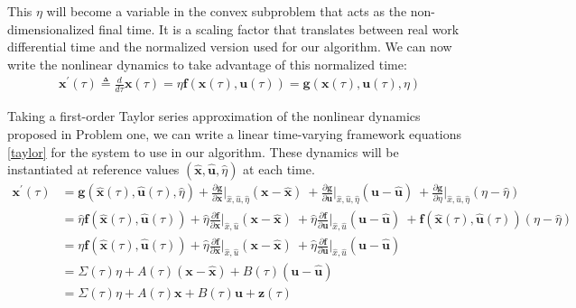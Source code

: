 This $\eta$ will become a variable in the convex subproblem that acts as the non-dimensionalized final time. It is a scaling factor that translates between real work differential time and the normalized version used for our algorithm. We can now write the nonlinear dynamics to take advantage of this normalized time:
\begin{align}
& \mathbf{x}^\prime(\tau) \triangleq \frac{d}{d\tau}\mathbf{x}(\tau) = \eta \mathbf{f}(\mathbf{x}(\tau), \mathbf{u}(\tau)) = \mathbf{g}(\mathbf{x}(\tau), \mathbf{u}(\tau), \eta)
\end{align}

Taking a first-order Taylor series approximation of the nonlinear dynamics proposed in Problem one, we can write a linear time-varying framework equations \ref{taylor} for the system to use in our algorithm. These dynamics will be instantiated at reference values $(\hat{\mathbf{x}}, \hat{\mathbf{u}}, \hat{\eta})$ at each time. 
%
\begin{subequations}
\label{taylor}
\begin{align}
\mathbf{x}^\prime(\tau) 
&= \mathbf{g}(\hat{\mathbf{x}}(\tau), \hat{\mathbf{u}}(\tau), \hat{\eta})
+ \frac{\partial \mathbf{g}}{\partial \mathbf{x}} \bigg\rvert_{\hat{x},\hat{u},\hat{\eta}} (\mathbf{x} - \hat{\mathbf{x}}) \ 
+ \frac{\partial \mathbf{g}}{\partial \mathbf{u}} \bigg\rvert_{\hat{x},\hat{u},\hat{\eta}} (\mathbf{u} - \hat{\mathbf{u}}) \ 
+ \frac{\partial \mathbf{g}}{\partial \eta} \bigg\rvert_{\hat{x},\hat{u},\hat{\eta}} (\eta - \hat{\eta}) \\
&= \hat{\eta} \mathbf{f}(\hat{\mathbf{x}}(\tau), \hat{\mathbf{u}}(\tau))
+ \hat{\eta} \frac{\partial \mathbf{f}}{\partial \mathbf{x}} \bigg\rvert_{\hat{x},\hat{u}} (\mathbf{x} - \hat{\mathbf{x}}) \
+ \hat{\eta} \frac{\partial \mathbf{f}}{\partial \mathbf{u}} \bigg\rvert_{\hat{x},\hat{u}} (\mathbf{u} - \hat{\mathbf{u}}) \
+ \mathbf{f}(\hat{\mathbf{x}}(\tau), \hat{\mathbf{u}}(\tau)) (\eta - \hat{\eta}) \\
&= {\eta} \mathbf{f}(\hat{\mathbf{x}}(\tau), \hat{\mathbf{u}}(\tau))
+ \hat{\eta} \frac{\partial \mathbf{f}}{\partial \mathbf{x}} \bigg\rvert_{\hat{x},\hat{u}} (\mathbf{x} - \hat{\mathbf{x}}) \
+ \hat{\eta} \frac{\partial \mathbf{f}}{\partial \mathbf{u}} \bigg\rvert_{\hat{x},\hat{u}} (\mathbf{u} - \hat{\mathbf{u}}) \\ 
& = \Sigma(\tau)\eta + A(\tau) (\mathbf{x} - \hat{\mathbf{x}}) + B(\tau)(\mathbf{u} - \hat{\mathbf{u}})  \\ 
&= \Sigma(\tau)\eta + A(\tau)\mathbf{x} + B(\tau)\mathbf{u} + \mathbf{z}(\tau)
\end{align}
\end{subequations}

